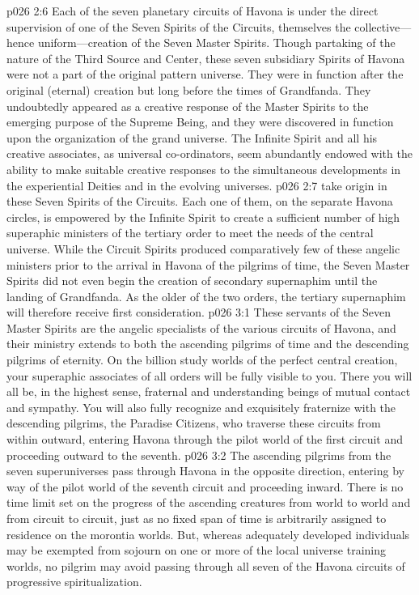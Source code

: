 \pc \vs p026 2:6 Each of the seven planetary circuits of Havona is under the direct supervision of one of the Seven Spirits of the Circuits, themselves the collective---hence uniform---creation of the Seven Master Spirits. Though partaking of the nature of the Third Source and Center, these seven subsidiary Spirits of Havona were not a part of the original pattern universe. They were in function after the original (eternal) creation but long before the times of Grandfanda. They undoubtedly appeared as a creative response of the Master Spirits to the emerging purpose of the Supreme Being, and they were discovered in function upon the organization of the grand universe. The Infinite Spirit and all his creative associates, as universal co\hyp{}ordinators, seem abundantly endowed with the ability to make suitable creative responses to the simultaneous developments in the experiential Deities and in the evolving universes.
\pc \vs p026 2:7  take origin in these Seven Spirits of the Circuits. Each one of them, on the separate Havona circles, is empowered by the Infinite Spirit to create a sufficient number of high superaphic ministers of the tertiary order to meet the needs of the central universe. While the Circuit Spirits produced comparatively few of these angelic ministers prior to the arrival in Havona of the pilgrims of time, the Seven Master Spirits did not even begin the creation of secondary supernaphim until the landing of Grandfanda. As the older of the two orders, the tertiary supernaphim will therefore receive first consideration.
\vs p026 3:1 These servants of the Seven Master Spirits are the angelic specialists of the various circuits of Havona, and their ministry extends to both the ascending pilgrims of time and the descending pilgrims of eternity. On the billion study worlds of the perfect central creation, your superaphic associates of all orders will be fully visible to you. There you will all be, in the highest sense, fraternal and understanding beings of mutual contact and sympathy. You will also fully recognize and exquisitely fraternize with the descending pilgrims, the Paradise Citizens, who traverse these circuits from within outward, entering Havona through the pilot world of the first circuit and proceeding outward to the seventh.\plusone
\vs p026 3:2 The ascending pilgrims from the seven superuniverses pass through Havona in the opposite direction, entering by way of the pilot world of the seventh circuit and proceeding inward. There is no time limit set on the progress of the ascending creatures from world to world and from circuit to circuit, just as no fixed span of time is arbitrarily assigned to residence on the morontia worlds. But, whereas adequately developed individuals may be exempted from sojourn on one or more of the local universe training worlds, no pilgrim may avoid passing through all seven of the Havona circuits of progressive spiritualization.

